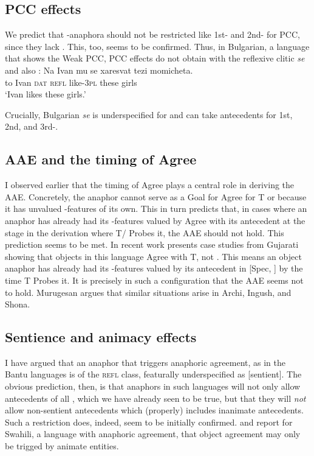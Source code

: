 \documentclass[output=paper, modfonts, nonflat]{langsci/langscibook}
\begin{document}
     \subsection{PCC effects}
  
     We predict that \nul-anaphora should not be restricted like 1st-
     and 2nd-\person{} for PCC, since they lack \person. This, too,
     seems to be confirmed. Thus, in Bulgarian, a language that shows
     the Weak PCC, PCC effects do not obtain with the reflexive clitic
     \textit{se} \citep[][500]{rivero:2004} and also
     \citet{nevins:2007}:
     \ea \gll Na Ivan mu se xaresvat tezi momicheta.\\
     to Ivan \textsc{dat} \textsc{refl} like-\textsc{3pl} these
     girls\\
     \glt `Ivan likes these girls.'  \z

 \noindent  Crucially, Bulgarian \textit{se} is underspecified for \person{}
     and can take antecedents for 1st, 2nd, and 3rd-\person.


      \subsection{AAE and the timing of Agree}

      I observed earlier that the timing of Agree plays a central role
      in deriving the AAE. Concretely, the anaphor cannot serve as a
      Goal for Agree for T or \lilv{} because it has unvalued
      \ph-features of its own. This in turn predicts that, in cases
      where an anaphor has already had its \ph-features valued by
      Agree with its antecedent at the stage in the derivation where
      T/\lilv{} Probes it, the AAE should not hold. This prediction
      seems to be met. In recent work \citet{murugesan:2018} presents
      case studies from Gujarati showing that objects in this language
      Agree with T, not \lilv. This means an object anaphor has
      already had its \ph-features valued by its antecedent in [Spec,
      \lilv] by the time T Probes it. It is precisely in such a
      configuration that the AAE seems not to hold. Murugesan argues
      that similar situations arise in Archi, Ingush, and Shona.  
      

      \subsection{Sentience and animacy effects}

      I have argued that an anaphor that triggers anaphoric agreement,
      as in the Bantu languages is of the \textsc{refl} class,
      featurally underspecified as [sentient]. The obvious prediction,
      then, is that anaphors in such languages will not only allow
      antecedents of all \person, which we have already seen to be
      true, but that they will \emph{not} allow non-sentient
      antecedents which (properly) includes inanimate
      antecedents. Such a restriction does, indeed, seem to be
      initially confirmed. \citet{woolford:1999} and \citet{vitale:1981} report
      for Swahili, a language with anaphoric agreement, that object
      agreement may only be trigged by animate entities. 
\end{document}
